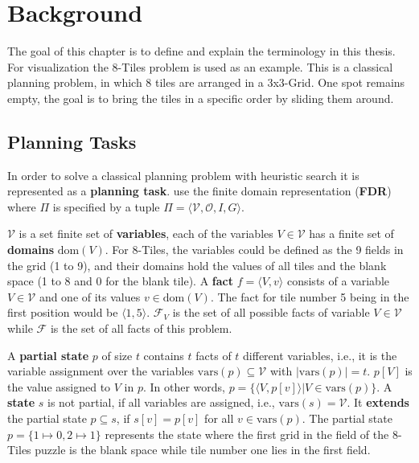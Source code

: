 
\chapter{Background}\label{ch:background}

The goal of this chapter is to define and explain the terminology in this thesis.
For visualization the 8-Tiles problem is used as an example.
This is a classical planning problem, in which 8 tiles are arranged in a 3x3-Grid.
One spot remains empty, the goal is to bring the tiles in a specific order by sliding them around.

\section {Planning Tasks}\label{sec:planning-tasks}
In order to solve a classical planning problem with heuristic search it is represented as a \textbf{planning task}.
\citeauthor{fivser2020strengthening} use the finite domain representation (\textbf{FDR}) where $\Pi$ is specified by a tuple $ \Pi = \langle \mathcal{V}, \mathcal{O}, I, G \rangle$.

$\mathcal{V}$ is a set finite set of \textbf{variables}, each of the variables $V\in\mathcal{V}$ has a finite set of \textbf{domains} $\text{dom}(V)$.
For 8-Tiles, the variables could be defined as the 9 fields in the grid (1 to 9), and their domains hold the values of all tiles and the blank space (1 to 8 and 0 for the blank tile).
A \textbf{fact} $f=\langle V, v\rangle$ consists of a variable $V\in\mathcal{V}$ and one of its values $v\in\text{dom}(V)$.
The fact for tile number 5 being in the first position would be $\langle 1,5\rangle$.
$\mathcal{F}_V$ is the set of all possible facts of variable $V\in\mathcal{V}$ while $\mathcal{F}$ is the set of all facts of this problem.

A \textbf{partial state} $p$ of size $t$ contains $t$ facts of $t$ different variables, i.e., it is the variable assignment over the variables $\text{vars}(p)\subseteq\mathcal{V}$ with $|\text{vars}(p)|=t$.
$p[V]$ is the value assigned to $V$ in $p$.
In other words, $p=\{\langle V, p[v] \rangle | V\in\text{vars}(p)\}$.
A \textbf{state} $s$ is not partial, if all variables are assigned, i.e., $\text{vars}(s)=\mathcal{V}$.
It \textbf{extends} the partial state $p\subseteq s$, if $s[v] = p[v]$ for all $v \in\text{vars}(p)$.
The partial state $p = \{1\mapsto0, 2\mapsto1\}$ represents the state where the first grid in the field of the 8-Tiles puzzle is the blank space while tile number one lies in the first field.

